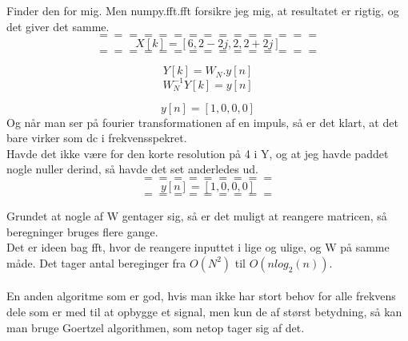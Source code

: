 \begin{rubrik}[Eksamenssæt2022]
\begin{eksamensOpgave}[DFT ]
\begin{UnderOpgave}[Beregn \text{$W_N$} for N = 4 og beregn derefter DFT transformationen af signalet]
            Finder den for mig. 
            Men numpy.fft.fft forsikre jeg mig, at resultatet er rigtig, og det giver det samme. 
            \[===============\]
            \[X[k] = [6, 2 - 2j, 2 , 2 + 2j]\]
            \[===============\]
        \end{UnderOpgave}
        \[Y[k] = W_N . y[n]\]
        \[W_N^{-1}Y[k] = y[n]\]
        \begin{UnderOpgave}
            \[y[n] = [1, 0, 0, 0]\]
            Og når man ser på fourier transformationen af en impuls, så er det klart, at det bare virker som dc i frekvensspekret.\\
            Havde det ikke være for den korte resolution på 4 i Y, og at jeg havde paddet nogle nuller derind, så havde det set anderledes ud. 
            \[=========\]
            \[y[n] = [1, 0, 0, 0]\]
            \[=========\]
        \end{UnderOpgave}
        \begin{UnderOpgave}
            Grundet at nogle af W gentager sig, så er det muligt at reangere matricen, så beregninger bruges flere gange. \\
            Det er ideen bag fft, hvor de reangere inputtet i lige og ulige, og W på samme måde. 
            Det tager antal bereginger fra $O(N^2)$ til $O(n log_2(n))$. \\\\
            En anden algoritme som er god, hvis man ikke har stort behov for alle frekvens dele som er med til at opbygge et signal, men kun de af størst betydning,
            så kan man bruge Goertzel algorithmen, som netop tager sig af det. 
        \end{UnderOpgave}
    \end{eksamensOpgave}
\end{rubrik}\setcounter{eksamensOpgave}{0}

